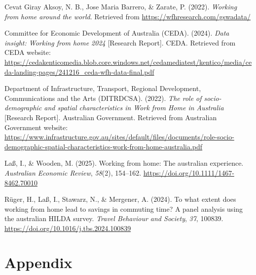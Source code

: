 \documentclass[
  a4paper,
]{article}
\newlength{\cslhangindent}
\newenvironment{CSLReferences}[2] %
 {\begin{list}{}{%
  \setlength{\itemindent}{0pt}
  \setlength{\leftmargin}{0pt}
  \setlength{\parsep}{0pt}
  \ifodd #1
   \setlength{\leftmargin}{\cslhangindent}
   \setlength{\itemindent}{-1\cslhangindent}
  \fi
  \setlength{\itemsep}{#2\baselineskip}}}
 {\end{list}}
\numberwithin{equation}{section}
\numberwithin{figure}{section}
\numberwithin{table}{section}
\begin{document}
\begin{CSLReferences}{1}{0}
Cevat Giray Aksoy, N. B., Jose Maria Barrero, \& Zarate, P. (2022). \emph{Working from home around the world}. Retrieved from \url{https://wfhresearch.com/gswadata/}

Committee for Economic Development of Australia (CEDA). (2024). \emph{Data insight: Working from home 2024} {[}Research Report{]}. CEDA. Retrieved from CEDA website: \url{https://cedakenticomedia.blob.core.windows.net/cedamediatest/kentico/media/ceda-landing-pages/241216_ceda-wfh-data-final.pdf}

Department of Infrastructure, Transport, Regional Development, Communications and the Arts (DITRDCSA). (2022). \emph{The role of socio-demographic and spatial characteristics in {Work from Home} in {Australia}} {[}Research Report{]}. Australian Government. Retrieved from Australian Government website: \url{https://www.infrastructure.gov.au/sites/default/files/documents/role-socio-demographic-spatial-characteristics-work-from-home-australia.pdf}

Laß, I., \& Wooden, M. (2025). Working from home: The australian experience. \emph{Australian Economic Review}, \emph{58}(2), 154--162. \url{https://doi.org/10.1111/1467-8462.70010}

Rüger, H., Laß, I., Stawarz, N., \& Mergener, A. (2024). To what extent does working from home lead to savings in commuting time? A panel analysis using the australian HILDA survey. \emph{Travel Behaviour and Society}, \emph{37}, 100839. \url{https://doi.org/10.1016/j.tbs.2024.100839}

\end{CSLReferences}

\clearpage
\vspace*{1cm}

\appendix

\section*{Appendix}\label{appendix}

\vspace*{0.8cm}

\setcounter{section}{0}
\renewcommand{\thesection}{A}

\setcounter{subsection}{0}
\renewcommand{\thesubsection}{A.\arabic{subsection}}

\end{document}
